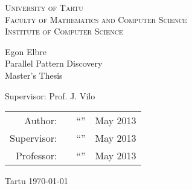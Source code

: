 \begin{titlepage}
\begin{center}

{\scshape
    University of Tartu                  \\[2mm]
    Faculty of Mathematics and Computer Science   \\[3mm]
    Institute of Computer Science
}

  {\Large Egon Elbre } \\[5mm]
  {\Huge  Parallel Pattern Discovery } \\[5mm]
  {\large Master's Thesis}

\begin{flushright}
    {\Large Supervisor: Prof. J. Vilo }
\end{flushright}


\begin{flushright}   
    \begin{tabular}{ r p{3cm} p{1cm} r }
                     Author:& \dotfill{} & ``\dotfill{}'' & May 2013 \\
                 Supervisor:& \dotfill{} & ``\dotfill{}'' & May 2013 \\
                  Professor:& \dotfill{} & ``\dotfill{}'' & May 2013
    \end{tabular}    
\end{flushright}


{\large Tartu \today}

\end{center}
\end{titlepage}

